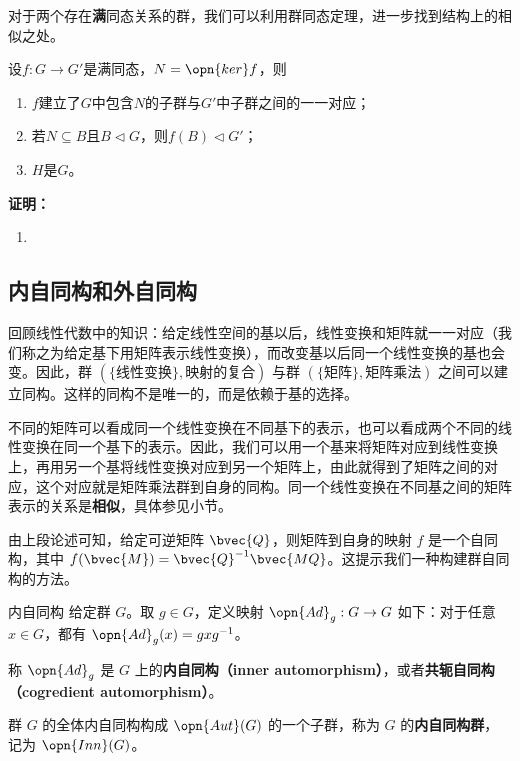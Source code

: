 对于两个存在\textbf{满}同态关系的群，我们可以利用群同态定理，进一步找到结构上的相似之处。
\begin{theorem}{}
设$f:G\to G'$是满同态，$N=\opn{ker}f$，则
\begin{enumerate}
\item $f$建立了$G$中包含$N$的子群与$G'$中子群之间的一一对应；
\item 若$N\subseteq B$且$B\lhd G$，则$f(B)\lhd G'$；
\item $H$是$G$。
\end{enumerate}
\end{theorem}
\textbf{证明：}
\begin{enumerate}
\item 
\end{enumerate}


\subsection{内自同构和外自同构}



回顾线性代数中的知识：给定线性空间的基以后，线性变换和矩阵就一一对应（我们称之为给定基下用矩阵表示线性变换），而改变基以后同一个线性变换的基也会变。因此，群 $(\{\text{线性变换}\}, \text{映射的复合})$ 与群 $(\{\text{矩阵}\}, \text{矩阵乘法})$ 之间可以建立同构。这样的同构不是唯一的，而是依赖于基的选择。

不同的矩阵可以看成同一个线性变换在不同基下的表示，也可以看成两个不同的线性变换在同一个基下的表示。因此，我们可以用一个基来将矩阵对应到线性变换上，再用另一个基将线性变换对应到另一个矩阵上，由此就得到了矩阵之间的对应，这个对应就是矩阵乘法群到自身的同构。同一个线性变换在不同基之间的矩阵表示的关系是\textbf{相似}，具体参见小节。

由上段论述可知，给定可逆矩阵 $\bvec{Q}$，则矩阵到自身的映射 $f$ 是一个自同构，其中 $f(\bvec{M})=\bvec{Q}^{-1}\bvec{MQ}$。这提示我们一种构建群自同构的方法。

\begin{definition}{内自同构}
给定群 $G$。取 $g\in G$，定义映射 $\opn{Ad}_g:G\to G$ 如下：对于任意 $x\in G$，都有 $\opn{Ad}_g(x)=gxg^{-1}$。

称 $\opn{Ad}_g$ 是 $G$ 上的\textbf{内自同构（inner automorphism）}，或者\textbf{共轭自同构（cogredient automorphism）}。


群 $G$ 的全体内自同构构成 $\opn{Aut}(G)$ 的一个子群，称为 $G$ 的\textbf{内自同构群}， 记为 $\opn{Inn}(G)$。

\end{definition}

